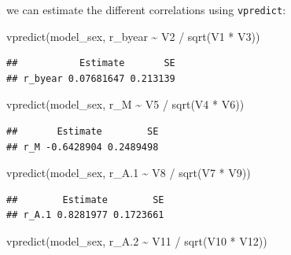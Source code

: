 \documentclass[
  12pt,
]{book}
\newenvironment{Shaded}{\begin{snugshade}}{\end{snugshade}}
\newcommand{\FloatTok}[1]{\textcolor[rgb]{0.00,0.00,0.81}{#1}}
\newcommand{\FunctionTok}[1]{\textcolor[rgb]{0.00,0.00,0.00}{#1}}
\newcommand{\NormalTok}[1]{#1}
\newcommand{\SpecialCharTok}[1]{\textcolor[rgb]{0.00,0.00,0.00}{#1}}
\begin{document}
we can estimate the different correlations using \texttt{vpredict}:

\begin{Shaded}
\begin{Highlighting}[]
\FunctionTok{vpredict}\NormalTok{(model\_sex, r\_byear }\SpecialCharTok{\textasciitilde{}}\NormalTok{ V2 }\SpecialCharTok{/} \FunctionTok{sqrt}\NormalTok{(V1 }\SpecialCharTok{*}\NormalTok{ V3))}
\end{Highlighting}
\end{Shaded}

\begin{verbatim}
##           Estimate       SE
## r_byear 0.07681647 0.213139
\end{verbatim}

\begin{Shaded}
\begin{Highlighting}[]
\FunctionTok{vpredict}\NormalTok{(model\_sex, r\_M }\SpecialCharTok{\textasciitilde{}}\NormalTok{ V5 }\SpecialCharTok{/} \FunctionTok{sqrt}\NormalTok{(V4 }\SpecialCharTok{*}\NormalTok{ V6))}
\end{Highlighting}
\end{Shaded}

\begin{verbatim}
##       Estimate        SE
## r_M -0.6428904 0.2489498
\end{verbatim}

\begin{Shaded}
\begin{Highlighting}[]
\FunctionTok{vpredict}\NormalTok{(model\_sex, r\_A}\FloatTok{.1} \SpecialCharTok{\textasciitilde{}}\NormalTok{ V8 }\SpecialCharTok{/} \FunctionTok{sqrt}\NormalTok{(V7 }\SpecialCharTok{*}\NormalTok{ V9))}
\end{Highlighting}
\end{Shaded}

\begin{verbatim}
##        Estimate        SE
## r_A.1 0.8281977 0.1723661
\end{verbatim}

\begin{Shaded}
\begin{Highlighting}[]
\FunctionTok{vpredict}\NormalTok{(model\_sex, r\_A}\FloatTok{.2} \SpecialCharTok{\textasciitilde{}}\NormalTok{ V11 }\SpecialCharTok{/} \FunctionTok{sqrt}\NormalTok{(V10 }\SpecialCharTok{*}\NormalTok{ V12))}
\end{Highlighting}
\end{Shaded}
\end{document}

